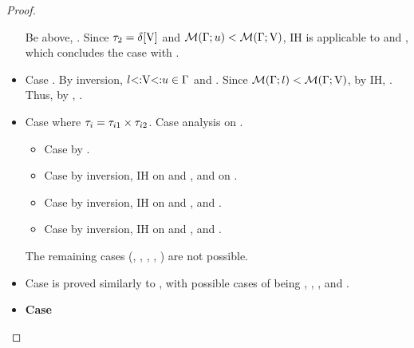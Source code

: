 \begin{proof}
\begin{itemize}
            Be  above,
            .
            Since $\tau_2 = \delta[\mathrm{V}]$ and 
            $\operatorname{\mathcal{M}}(\Gamma;u) < \operatorname{\mathcal{M}}(\Gamma;\mathrm{V})$,
            IH is applicable to  and 
            , which concludes the case with
            .
        \item Case  .
            By inversion, $l{\operatorname{<:}}\mathrm{V}{\operatorname{<:}}u \in \Gamma$ and
            .
            Since $\operatorname{\mathcal{M}}(\Gamma;l) < \operatorname{\mathcal{M}}(\Gamma;\mathrm{V})$, by IH,
            .
            Thus, by , .
        \item Case  
            where $\tau_i = \tau_{i1} \times \tau_{i2}$.
            Case analysis on .
            \begin{itemize}
                \item Case  by .
                \item Case  by inversion, IH on 
                     and
                    , and  on
                    .
                \item Case  by inversion, IH on
                     and 
                    , and .
                \item Case  
                    by inversion, IH on
                     and
                    , and .
            \end{itemize}
            The remaining cases
            (, , , , ) 
            are not possible.
        \item Case  is proved similarly to , with
            possible cases of  being
            , , , and .
        \item \textbf{Case } 

\end{itemize}
\end{proof}
